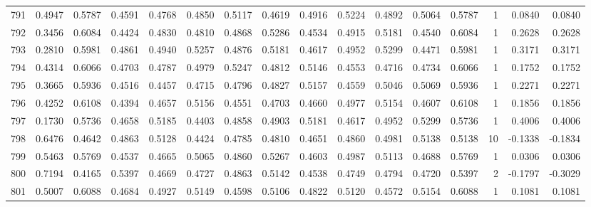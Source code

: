 \begin{tabular}{lrrrrrrrrrrrrrrr}
791 &      0.4947 &  0.5787 &  0.4591 &  0.4768 &  0.4850 &  0.5117 &  0.4619 &  0.4916 &  0.5224 &  0.4892 &   0.5064 &     0.5787 &      1 &                    0.0840 &                     0.0840 \\
792 &      0.3456 &  0.6084 &  0.4424 &  0.4830 &  0.4810 &  0.4868 &  0.5286 &  0.4534 &  0.4915 &  0.5181 &   0.4540 &     0.6084 &      1 &                    0.2628 &                     0.2628 \\
793 &      0.2810 &  0.5981 &  0.4861 &  0.4940 &  0.5257 &  0.4876 &  0.5181 &  0.4617 &  0.4952 &  0.5299 &   0.4471 &     0.5981 &      1 &                    0.3171 &                     0.3171 \\
794 &      0.4314 &  0.6066 &  0.4703 &  0.4787 &  0.4979 &  0.5247 &  0.4812 &  0.5146 &  0.4553 &  0.4716 &   0.4734 &     0.6066 &      1 &                    0.1752 &                     0.1752 \\
795 &      0.3665 &  0.5936 &  0.4516 &  0.4457 &  0.4715 &  0.4796 &  0.4827 &  0.5157 &  0.4559 &  0.5046 &   0.5069 &     0.5936 &      1 &                    0.2271 &                     0.2271 \\
796 &      0.4252 &  0.6108 &  0.4394 &  0.4657 &  0.5156 &  0.4551 &  0.4703 &  0.4660 &  0.4977 &  0.5154 &   0.4607 &     0.6108 &      1 &                    0.1856 &                     0.1856 \\
797 &      0.1730 &  0.5736 &  0.4658 &  0.5185 &  0.4403 &  0.4858 &  0.4903 &  0.5181 &  0.4617 &  0.4952 &   0.5299 &     0.5736 &      1 &                    0.4006 &                     0.4006 \\
798 &      0.6476 &  0.4642 &  0.4863 &  0.5128 &  0.4424 &  0.4785 &  0.4810 &  0.4651 &  0.4860 &  0.4981 &   0.5138 &     0.5138 &     10 &                   -0.1338 &                    -0.1834 \\
799 &      0.5463 &  0.5769 &  0.4537 &  0.4665 &  0.5065 &  0.4860 &  0.5267 &  0.4603 &  0.4987 &  0.5113 &   0.4688 &     0.5769 &      1 &                    0.0306 &                     0.0306 \\
800 &      0.7194 &  0.4165 &  0.5397 &  0.4669 &  0.4727 &  0.4863 &  0.5142 &  0.4538 &  0.4749 &  0.4794 &   0.4720 &     0.5397 &      2 &                   -0.1797 &                    -0.3029 \\
801 &      0.5007 &  0.6088 &  0.4684 &  0.4927 &  0.5149 &  0.4598 &  0.5106 &  0.4822 &  0.5120 &  0.4572 &   0.5154 &     0.6088 &      1 &                    0.1081 &                     0.1081 \\

\end{tabular}
